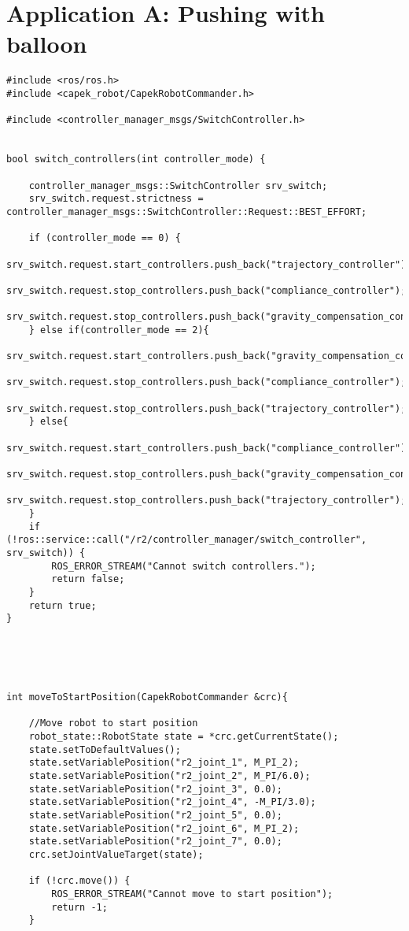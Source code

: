 \chapter{Application A: Pushing with balloon}

\begin{lstlisting}
#include <ros/ros.h>
#include <capek_robot/CapekRobotCommander.h>

#include <controller_manager_msgs/SwitchController.h>


bool switch_controllers(int controller_mode) {

	controller_manager_msgs::SwitchController srv_switch;
	srv_switch.request.strictness = controller_manager_msgs::SwitchController::Request::BEST_EFFORT;

	if (controller_mode == 0) {
		srv_switch.request.start_controllers.push_back("trajectory_controller");
		srv_switch.request.stop_controllers.push_back("compliance_controller");
		srv_switch.request.stop_controllers.push_back("gravity_compensation_controller");
	} else if(controller_mode == 2){
		srv_switch.request.start_controllers.push_back("gravity_compensation_controller");
		srv_switch.request.stop_controllers.push_back("compliance_controller");
		srv_switch.request.stop_controllers.push_back("trajectory_controller");
	} else{
		srv_switch.request.start_controllers.push_back("compliance_controller");
		srv_switch.request.stop_controllers.push_back("gravity_compensation_controller");
		srv_switch.request.stop_controllers.push_back("trajectory_controller");
	}
	if (!ros::service::call("/r2/controller_manager/switch_controller", srv_switch)) {
		ROS_ERROR_STREAM("Cannot switch controllers.");
		return false;
	}
	return true;
}





int moveToStartPosition(CapekRobotCommander &crc){

	//Move robot to start position
	robot_state::RobotState state = *crc.getCurrentState();
	state.setToDefaultValues();
	state.setVariablePosition("r2_joint_1", M_PI_2);
	state.setVariablePosition("r2_joint_2", M_PI/6.0);
	state.setVariablePosition("r2_joint_3", 0.0);
	state.setVariablePosition("r2_joint_4", -M_PI/3.0);
	state.setVariablePosition("r2_joint_5", 0.0);
	state.setVariablePosition("r2_joint_6", M_PI_2);
	state.setVariablePosition("r2_joint_7", 0.0);
	crc.setJointValueTarget(state);

	if (!crc.move()) {
		ROS_ERROR_STREAM("Cannot move to start position");
		return -1;
	}


\end{lstlisting}
